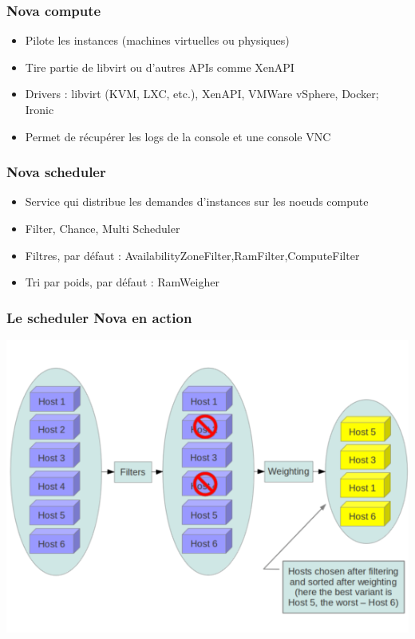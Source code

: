   \begin{frame}
    \frametitle{Nova compute}
    \begin{itemize}
      \item Pilote les instances (machines virtuelles ou physiques)
      \item Tire partie de libvirt ou d'autres APIs comme XenAPI
      \item Drivers : libvirt (KVM, LXC, etc.), XenAPI, VMWare vSphere, Docker; Ironic
      \item Permet de récupérer les logs de la console et une console VNC
    \end{itemize}
  \end{frame}

  \begin{frame}
    \frametitle{Nova scheduler}
    \begin{itemize}
      \item Service qui distribue les demandes d'instances sur les noeuds compute
      \item Filter, Chance, Multi Scheduler
      \item Filtres, par défaut : AvailabilityZoneFilter,RamFilter,ComputeFilter
      \item Tri par poids, par défaut : RamWeigher
    \end{itemize}
  \end{frame}

  \begin{frame}
    \frametitle{Le scheduler Nova en action}
    \includegraphics[width=\textwidth]{images/scheduling-schema.png}
  \end{frame}

